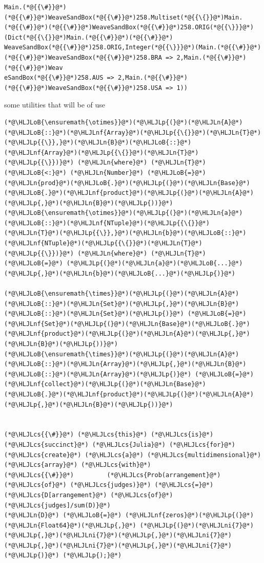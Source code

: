 \documentclass[12pt,a4paper]{article}
\newcommand{\HLJLn}[1]{#1}
\newcommand{\HLJLnf}[1]{\textcolor[RGB]{66,102,213}{#1}}
\newcommand{\HLJLni}[1]{\textcolor[RGB]{59,151,46}{#1}}
\newcommand{\HLJLoB}[1]{\textcolor[RGB]{102,102,102}{\textbf{#1}}}
\newcommand{\HLJLp}[1]{#1}
\newcommand{\HLJLcs}[1]{\textcolor[RGB]{153,153,119}{\textit{#1}}}
\begin{document}
\begin{lstlisting}
Main.(*@{{\#}}@*)(*@{{\#}}@*)WeaveSandBox(*@{{\#}}@*)258.Multiset(*@{{\{}}@*)Main.(*@{{\#}}@*)(*@{{\#}}@*)WeaveSandBox(*@{{\#}}@*)258.ORIG(*@{{\}}}@*)(Dict(*@{{\{}}@*)Main.(*@{{\#}}@*)(*@{{\#}}@*)
WeaveSandBox(*@{{\#}}@*)258.ORIG,Integer(*@{{\}}}@*)(Main.(*@{{\#}}@*)(*@{{\#}}@*)WeaveSandBox(*@{{\#}}@*)258.BRA => 2,Main.(*@{{\#}}@*)(*@{{\#}}@*)Weav
eSandBox(*@{{\#}}@*)258.AUS => 2,Main.(*@{{\#}}@*)(*@{{\#}}@*)WeaveSandBox(*@{{\#}}@*)258.USA => 1))
\end{lstlisting}


some utilities that will be of use


\begin{lstlisting}
(*@\HLJLoB{\ensuremath{\otimes}}@*)(*@\HLJLp{(}@*)(*@\HLJLn{A}@*)(*@\HLJLoB{::}@*)(*@\HLJLnf{Array}@*)(*@\HLJLp{{\{}}@*)(*@\HLJLn{T}@*)(*@\HLJLp{{\}},}@*)(*@\HLJLn{B}@*)(*@\HLJLoB{::}@*)(*@\HLJLnf{Array}@*)(*@\HLJLp{{\{}}@*)(*@\HLJLn{T}@*)(*@\HLJLp{{\}})}@*) (*@\HLJLn{where}@*) (*@\HLJLn{T}@*)(*@\HLJLoB{<:}@*) (*@\HLJLn{Number}@*) (*@\HLJLoB{=}@*) (*@\HLJLn{prod}@*)(*@\HLJLoB{.}@*)(*@\HLJLp{(}@*)(*@\HLJLn{Base}@*)(*@\HLJLoB{.}@*)(*@\HLJLnf{product}@*)(*@\HLJLp{(}@*)(*@\HLJLn{A}@*)(*@\HLJLp{,}@*)(*@\HLJLn{B}@*)(*@\HLJLp{))}@*)
(*@\HLJLoB{\ensuremath{\otimes}}@*)(*@\HLJLp{(}@*)(*@\HLJLn{a}@*)(*@\HLJLoB{::}@*)(*@\HLJLnf{NTuple}@*)(*@\HLJLp{{\{}}@*)(*@\HLJLn{T}@*)(*@\HLJLp{{\}},}@*)(*@\HLJLn{b}@*)(*@\HLJLoB{::}@*)(*@\HLJLnf{NTuple}@*)(*@\HLJLp{{\{}}@*)(*@\HLJLn{T}@*)(*@\HLJLp{{\}})}@*) (*@\HLJLn{where}@*) (*@\HLJLn{T}@*)  (*@\HLJLoB{=}@*) (*@\HLJLp{(}@*)(*@\HLJLn{a}@*)(*@\HLJLoB{...}@*)(*@\HLJLp{,}@*)(*@\HLJLn{b}@*)(*@\HLJLoB{...}@*)(*@\HLJLp{)}@*)

(*@\HLJLoB{\ensuremath{\times}}@*)(*@\HLJLp{(}@*)(*@\HLJLn{A}@*)(*@\HLJLoB{::}@*)(*@\HLJLn{Set}@*)(*@\HLJLp{,}@*)(*@\HLJLn{B}@*)(*@\HLJLoB{::}@*)(*@\HLJLn{Set}@*)(*@\HLJLp{)}@*) (*@\HLJLoB{=}@*) (*@\HLJLnf{Set}@*)(*@\HLJLp{(}@*)(*@\HLJLn{Base}@*)(*@\HLJLoB{.}@*)(*@\HLJLnf{product}@*)(*@\HLJLp{(}@*)(*@\HLJLn{A}@*)(*@\HLJLp{,}@*)(*@\HLJLn{B}@*)(*@\HLJLp{))}@*)
(*@\HLJLoB{\ensuremath{\times}}@*)(*@\HLJLp{(}@*)(*@\HLJLn{A}@*)(*@\HLJLoB{::}@*)(*@\HLJLn{Array}@*)(*@\HLJLp{,}@*)(*@\HLJLn{B}@*)(*@\HLJLoB{::}@*)(*@\HLJLn{Array}@*)(*@\HLJLp{)}@*) (*@\HLJLoB{=}@*) (*@\HLJLnf{collect}@*)(*@\HLJLp{(}@*)(*@\HLJLn{Base}@*)(*@\HLJLoB{.}@*)(*@\HLJLnf{product}@*)(*@\HLJLp{(}@*)(*@\HLJLn{A}@*)(*@\HLJLp{,}@*)(*@\HLJLn{B}@*)(*@\HLJLp{))}@*)


(*@\HLJLcs{{\#}}@*) (*@\HLJLcs{this}@*) (*@\HLJLcs{is}@*) (*@\HLJLcs{succinct}@*) (*@\HLJLcs{Julia}@*) (*@\HLJLcs{for}@*) (*@\HLJLcs{create}@*) (*@\HLJLcs{a}@*) (*@\HLJLcs{multidimensional}@*) (*@\HLJLcs{array}@*) (*@\HLJLcs{with}@*) 
(*@\HLJLcs{{\#}}@*) 		(*@\HLJLcs{Prob(arrangement}@*) (*@\HLJLcs{of}@*) (*@\HLJLcs{judges)}@*) (*@\HLJLcs{=}@*) (*@\HLJLcs{D[arrangement}@*) (*@\HLJLcs{of}@*) (*@\HLJLcs{judges]/sum(D)}@*)
(*@\HLJLn{D}@*) (*@\HLJLoB{=}@*) (*@\HLJLnf{zeros}@*)(*@\HLJLp{(}@*)(*@\HLJLn{Float64}@*)(*@\HLJLp{,}@*) (*@\HLJLp{(}@*)(*@\HLJLni{7}@*)(*@\HLJLp{,}@*)(*@\HLJLni{7}@*)(*@\HLJLp{,}@*)(*@\HLJLni{7}@*)(*@\HLJLp{,}@*)(*@\HLJLni{7}@*)(*@\HLJLp{,}@*)(*@\HLJLni{7}@*)(*@\HLJLp{)}@*) (*@\HLJLp{);}@*)


\end{lstlisting}
\end{document}
